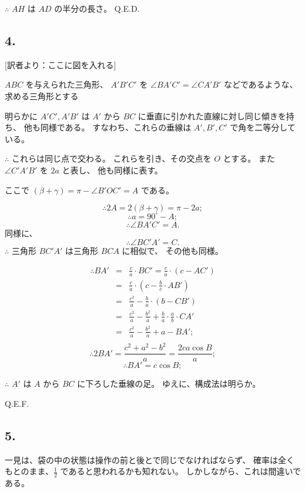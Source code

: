 $\therefore$
$AH$ は $AD$ の半分の長さ。
Q.E.D.

\subsection*{4.}

[訳者より：ここに図を入れる]

$ABC$ を与えられた三角形、
$A'B'C'$ を $\angle BA'C' = \angle CA'B'$ などであるような、
求める三角形とする

明らかに $A'C', A'B'$ は $A'$ から $BC$
に垂直に引かれた直線に対し同じ傾きを持ち、
他も同様である。
すなわち、これらの垂線は $A', B', C'$
で角を二等分している。

$\therefore$ これらは同じ点で交わる。
これらを引き、その交点を $O$ とする。
また $\angle C'A'B'$ を $2a$ と表し、
他も同様に表す。

ここで $(\beta + \gamma) = \pi - \angle B'OC' = A$ である。

\[
\therefore 2A = 2(\beta + \gamma) = \pi - 2a;
\]
\[
\therefore a = 90^\circ - A;
\]
\[
\therefore \angle BA'C' = A.
\]
同様に、
\[
\therefore \angle BC'A' = C.
\]
$\therefore$ 三角形 $BC'A'$ は三角形 $BCA$ に相似で、
その他も同様。

\begin{eqnarray*}
\therefore BA'
 &=& \frac{c}{a} \cdot BC' = \frac{c}{a} \cdot (c - AC')\\
 &=& \frac{c}{a} \cdot (c - \frac{b}{c} \cdot AB')\\
 &=& \frac{c^2}{a} - \frac{b}{a}\cdot(b - CB')\\
 &=& \frac{c^2}{a} - \frac{b^2}{a} + \frac{b}{a} \cdot \frac{a}{b}\cdot CA'\\
 &=& \frac{c^2}{a} - \frac{b^2}{a} + a - BA';\\
\end{eqnarray*}
\[
\therefore
2BA' = \frac{c^2 + a^2 - b^2}{a} = \frac{2 ca \cos B}{a};
\]
\[
\therefore
BA' = c \cos B;
\]

$\therefore$ $A'$ は $A$ から $BC$ に下ろした垂線の足。
ゆえに、構成法は明らか。

Q.E.F.


\subsection*{5.}

一見は、袋の中の状態は操作の前と後とで同じでなければならず、
確率は全くもとのまま、$\frac{1}{2}$ であると思われるかも知れない。
しかしながら、これは間違いである。

